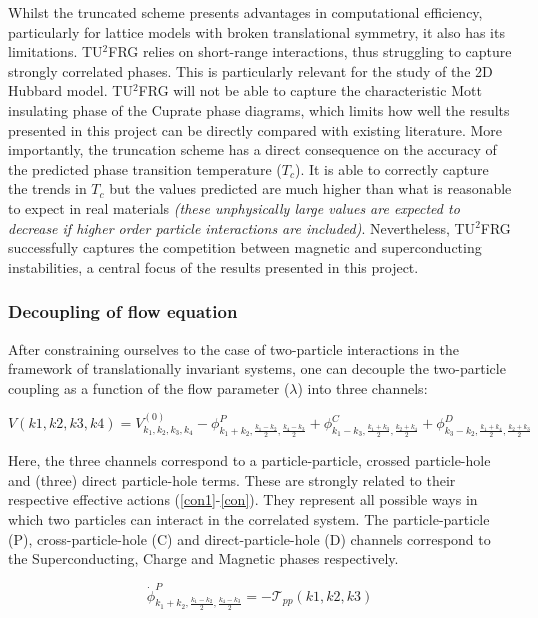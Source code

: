 \documentclass[11pt]{article}
\begin{document}
\noindent Whilst the truncated scheme presents advantages in computational efficiency, particularly for lattice models with broken translational symmetry, it also has its limitations. 
TU$^2$FRG relies on short-range interactions, thus struggling to capture strongly correlated phases. 
This is particularly relevant for the study of the 2D Hubbard model. TU$^2$FRG will not be able to capture
the characteristic Mott insulating phase of the Cuprate phase diagrams\cite{imada1998metal}, which limits how well the results presented in this project can be directly compared with existing literature. 
More importantly, the truncation scheme has a direct consequence on the accuracy of the predicted phase transition temperature ($T_c$). It is able to correctly capture
the trends in $T_c$ but the values predicted are much higher than what is reasonable to expect in real materials \textit{(these unphysically large values are expected to decrease if higher order particle interactions are included)}.
Nevertheless, TU$^2$FRG successfully captures the competition between magnetic and superconducting instabilities, a central focus of the results presented in this project. 
\subsubsection{Decoupling of flow equation}
After constraining ourselves to the case of two-particle interactions in the framework of translationally invariant systems, one can decouple the two-particle coupling as a function of the flow parameter ($\lambda$) into three channels:

\begin{equation} \label{V decoupling}
    V(k1,k2,k3,k4)= V_{k_1, k_2, k_3, k_4}^{(0)} - \phi^{P}_{k_1 +k_2, \frac{k_1 - k_2}{2}, \frac{k_4-k_3}{2}} + \phi^{C}_{k_1 - k_3, \frac{k_1 +k_3}{2}, \frac{k_2+k_4}{2}} +\phi^{D}_{k_3- k_2, \frac{k_1 + k_4}{2}, \frac{k_2+k_3}{2}}
\end{equation}

\noindent Here, the three channels correspond to a particle-particle, crossed particle-hole and (three) direct particle-hole terms. These are strongly related to their respective effective actions (\ref{con1}-\ref{con}). They represent all possible ways in which two particles can interact in the correlated system. The particle-particle (P), cross-particle-hole (C) and direct-particle-hole (D) channels
correspond to the Superconducting, Charge and Magnetic phases respectively. 

\begin{equation}\label{con1}
    \dot{\phi}^{P}_{k_1 +k_2, \frac{k_1 - k_2}{2}, \frac{k_4-k_3}{2}} = - \mathcal{T}_{pp}(k1,k2,k3)
\end{equation}
\end{document}
